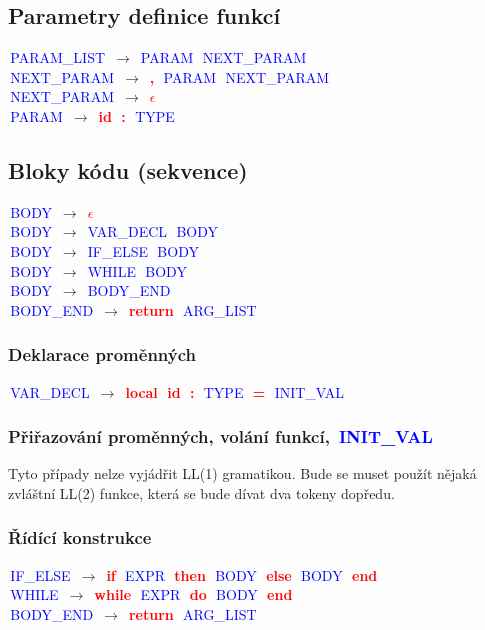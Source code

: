 \documentclass[a4paper]{article}
\theoremstyle{definition}
\newcommand{\nter}[1]{\textcolor{blue}{\,#1\,}}
\newcommand{\ter}[1]{\textbf{\textcolor{red}{\,#1\,}}}
\newcommand{\grule}[2]{{\small\nter{#1} $\to$ #2}\\}
\begin{document}
\begin{multicols}{2}
	\subsection{Parametry definice funkcí}

	\grule{PARAM\_LIST}{\nter{PARAM} \nter{NEXT\_PARAM}}
	\grule{NEXT\_PARAM}{\ter{,} \nter{PARAM} \nter{NEXT\_PARAM}}
	\grule{NEXT\_PARAM}{\ter{$\epsilon$}}
	\grule{PARAM}{\ter{id} \ter{:} \nter{TYPE}}

	\subsection{Bloky kódu (sekvence)}

	\grule{BODY}{\ter{$\epsilon$}}
	\grule{BODY}{\nter{VAR\_DECL} \nter{BODY}}
	\grule{BODY}{\nter{IF\_ELSE} \nter{BODY}}
	\grule{BODY}{\nter{WHILE} \nter{BODY}}
	\grule{BODY}{\nter{BODY\_END}}
	\grule{BODY\_END}{\ter{return} \nter{ARG\_LIST}}

	\subsubsection{Deklarace proměnných}
	\grule{VAR\_DECL}{\ter{local} \ter{id} \ter{:} \nter{TYPE} \ter{=} \nter{INIT\_VAL}}
	\subsubsection{Přiřazování proměnných, volání funkcí, \nter{INIT\_VAL}}

	Tyto případy nelze vyjádřit LL(1) gramatikou. Bude se muset použít nějaká zvláštní LL(2) funkce, která se bude dívat dva tokeny dopředu.

	\subsubsection{Řídící konstrukce}

	\grule{IF\_ELSE}{\ter{if} \nter{EXPR} \ter{then} \nter{BODY} \ter{else} \nter{BODY} \ter{end}}
	\grule{WHILE}{\ter{while} \nter{EXPR} \ter{do} \nter{BODY} \ter{end}}
	\grule{BODY\_END}{\ter{return} \nter{ARG\_LIST}} %

	\end{multicols}
\end{document}

